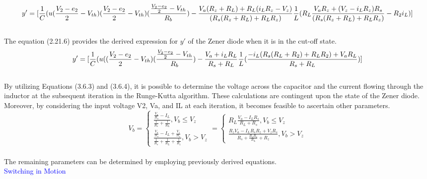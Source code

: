 \begin{equation}
    y'=[\frac{1}{C}(u(\frac{V_2-e_2}{2}-V_{th})(\frac{V_2-e_2}{2}-V_{th})(\frac{\frac{V_2-e_2}{2}-V_{th}}{R_b})-\frac{V_a(R_z+R_L)+R_L(i_LR_z-V_z)}{(R_s(R_z+R_L)+R_LR_z)}\\
    \frac{1}{L}(R_L\frac{V_aR_z+(V_z-i_LR_z)R_s}{(R_s(R_z+R_L)+R_LR_z)}-R_2i_L)]
\end{equation}\\

The equation (2.21.6) provides the derived expression for $y'$ of the Zener diode when it is in the cut-off state.\\

\begin{equation}
    y'=[\frac{1}{C}(u((\frac{V_2-e_2}{2}-V_{th})(\frac{\frac{V_2-e_2}{2}-V_{th}}{R_b})-\frac{V_a+i_LR_L}{R_s+R_L}\\
    \frac{1}{L}(\frac{-i_L(R_s(R_L+R_2)+R_LR_2)+V_aR_L}{R_s+R_L})]
\end{equation}\\

By utilizing Equations (3.6.3) and (3.6.4), it is possible to determine the voltage across the capacitor and the current flowing through the inductor at the subsequent iteration in the Runge-Kutta algorithm. These calculations are contingent upon the state of the Zener diode. Moreover, by considering the input voltage V2, Va, and IL at each iteration, it becomes feasible to ascertain other parameters.\\

\begin{equation}
    V_b=\begin{cases}
        \frac{\frac{V_a}{R_s}-I_L}{\frac{1}{R_s}+\frac{1}{R_L}}, V_b \leq V_z\\
        \frac{\frac{V_a}{R_s}-I_L+\frac{V_z}{R_z}}{\frac{1}{R_s}+\frac{1}{R_L}+\frac{1}{R_z}}, V_b>V_z
    \end{cases}=\begin{cases}
        R_L\frac{V_a-I_LR_s}{R_L+R_s}, V_b \leq V_z\\
        \frac{R_zV_a-I_LR_sR_z+V_zR_s}{R_s+\frac{R_sR_z}{R_L}+R_z}, V_b>V_z
    \end{cases}
\end{equation}\\

The remaining parameters can be determined by employing previously derived equations.\\

\Large\textcolor{blue}{Switching in Motion}\\

